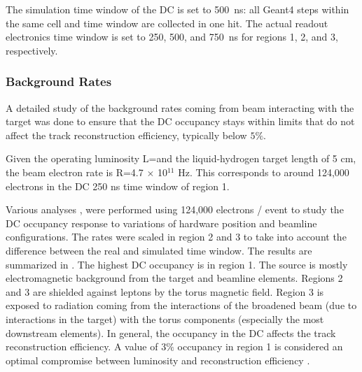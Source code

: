 The simulation time window of the DC is set to 500~ns: all Geant4 steps within the same cell and time window are
collected in one hit.
The actual readout electronics time window is set to 250, 500, and 750~ns for regions 1, 2, and 3, respectively.


\subsubsection{Background Rates}

A detailed study of the background rates coming from beam interacting with the target was done to ensure that
the DC occupancy stays within limits that do not affect the track reconstruction efficiency, typically below $5\%$.

Given the operating luminosity L=\cLuminosity and the liquid-hydrogen target length of 5 cm, the beam electron rate
is R=4.7 $\times$ 10$^{11}$ Hz. This corresponds to around 124,000 electrons in the DC 250 ns time window of region 1.

Various analyses \cite{targetStudy, clas12Beamline, clas12Background}, were performed using 124,000 electrons / event
to study the DC occupancy response to variations of hardware position and beamline configurations.
The rates were scaled in region 2 and 3 to take into account the difference between the real and simulated time window.
The results are summarized in . The highest DC occupancy is in region 1.
The source is mostly electromagnetic background from the target and beamline elements.
Regions 2 and 3 are shielded against leptons by the torus magnetic field.
Region 3 is exposed to radiation coming from the interactions of the broadened beam
(due to interactions in the target) with the torus components (especially the most downstream elements).
In general, the occupancy in the DC affects the track reconstruction efficiency. A value of 3$\%$ occupancy in region 1
is considered an optimal compromise between luminosity and reconstruction efficiency \cite{recon-nim}.

